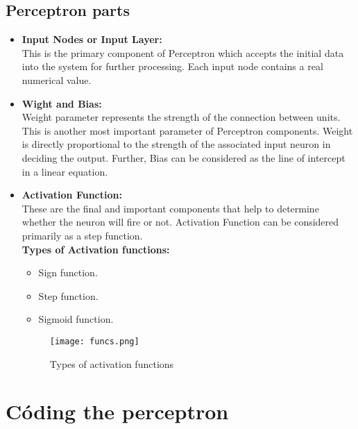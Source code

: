 \subsection{Perceptron parts}
\begin{itemize}
\item \textbf{Input Nodes or Input Layer:} \\
  This is the primary component of Perceptron which accepts the initial data into the system for
  further processing. Each input node contains a real numerical value.
\item \textbf{Wight and Bias:} \\
  Weight parameter represents the strength of the connection between units. This is another most
  important parameter of Perceptron components. Weight is directly proportional to the strength of the
  associated input neuron in deciding the output. Further, Bias can be considered as the line of
  intercept in a linear equation.
\item \textbf{Activation Function:} \\
  These are the final and important components that help to determine whether the neuron will
  fire or not. Activation Function can be considered primarily as a step function.\\
  \textbf{Types of Activation functions:}
  \begin{itemize}
  \item Sign function.
  \item Step function.
  \item Sigmoid function.
  \end{itemize}
  \begin{figure}[h]
    \centering
    \texttt{[image: funcs.png]}
    \caption{Types of activation functions}
  \end{figure}
\end{itemize}
\section{Códing the perceptron}
